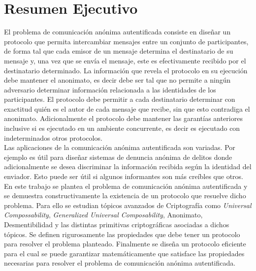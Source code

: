 \section{Resumen Ejecutivo}

El problema de comunicación anónima autentificada consiste en diseñar un protocolo
que permita intercambiar mensajes entre un conjunto de participantes, de forma tal
que cada emisor de un mensaje determina el destinatario de su
mensaje y, una vez que se envía el mensaje,  este es efectivamente recibido por el destinatario
determinado. La información que revela el protocolo en su ejecución debe mantener el
anonimato, es decir debe ser tal que no permite a ningún adversario determinar 
información relacionada a las identidades  de los participantes.
El protocolo debe permitir a cada destinatario determinar con exactitud quién es el autor
de cada mensaje que recibe, sin que esto contradiga el anonimato.
Adicionalmente el protocolo debe mantener las garantías anteriores inclusive si es ejecutado en
un ambiente concurrente, es decir es ejecutado con indeterminados otros protocolos.\\
Las aplicaciones de la comunicación anónima autentificada son variadas. Por ejemplo es útil
para diseñar sistemas de denuncia anónima de delitos donde adicionalmente se desea discriminar
la información recibida según la identidad del enviador. Esto puede ser útil si algunos
informantes son más creíbles que otros.\\
En este trabajo se plantea el problema de comunicación anónima autentificada y se
demuestra constructivamente la existencia de un protocolo que resuelve dicho problema.
Para ello se estudian tópicos avanzados de Criptografía como \textit{Universal
Compossability}, \textit{Generalized Universal Composability}, Anonimato,
Desmentibilidad y las distintas primitivas criptográficas asociadas a dichos tópicos.
Se definen rigurosamente las propiedades que debe tener un protocolo para
resolver el problema planteado.
Finalmente se diseña un protocolo eficiente para el cual se puede garantizar
matemáticamente que satisface las propiedades necesarias para resolver el problema
de comunicación anónima autentificada.

